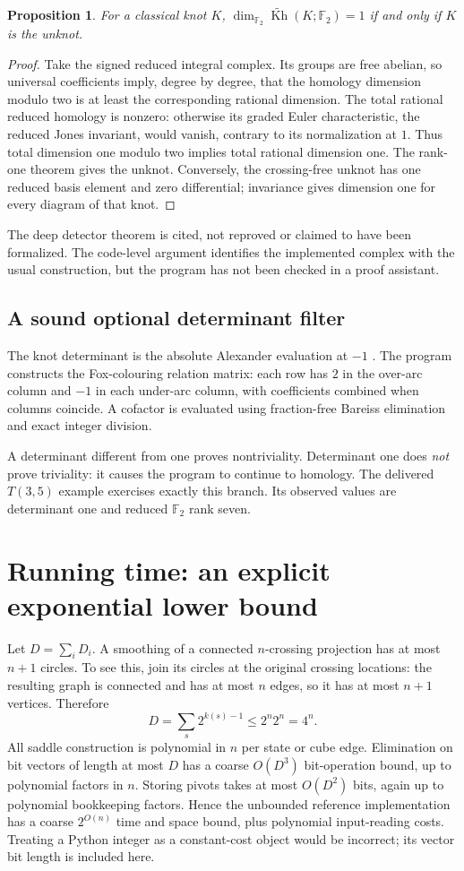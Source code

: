 \documentclass[11pt]{article}
\newtheorem{proposition}[theorem]{Proposition}
\theoremstyle{remark}\newtheorem{remark}[theorem]{Remark}
\newcommand{\F}{\mathbb F_2}
\newcommand{\Kh}{\widetilde{\operatorname{Kh}}}
\begin{document}
\begin{proposition}
For a classical knot $K$, $\dim_{\F}\Kh(K;\F)=1$ if and only if $K$ is the
unknot.
\end{proposition}
\begin{proof}
Take the signed reduced integral complex. Its groups are free abelian, so
universal coefficients imply, degree by degree, that the homology dimension
modulo two is at least the corresponding rational dimension. The total
rational reduced homology is nonzero: otherwise its graded Euler
characteristic, the reduced Jones invariant, would vanish, contrary to its
normalization at $1$. Thus total dimension one modulo two implies total
rational dimension one. The rank-one theorem gives the unknot. Conversely,
the crossing-free unknot has one reduced basis element and zero differential;
invariance gives dimension one for every diagram of that knot.
\end{proof}

The deep detector theorem is cited, not reproved or claimed to have been
formalized. The code-level argument identifies the implemented complex with
the usual construction, but the program has not been checked in a proof
assistant.

\subsection{A sound optional determinant filter}
The knot determinant is the absolute Alexander evaluation at $-1$
\cite{determinant}. The program constructs the Fox-colouring relation matrix:
each row has $2$ in the over-arc column and $-1$ in each under-arc column, with
coefficients combined when columns coincide. A cofactor is evaluated using
fraction-free Bareiss elimination and exact integer division.

A determinant different from one proves nontriviality. Determinant one does
\emph{not} prove triviality: it causes the program to continue to homology.
The delivered $T(3,5)$ example exercises exactly this branch. Its observed
values are determinant one and reduced $\F$ rank seven.

\section{Running time: an explicit exponential lower bound}

Let $D=\sum_iD_i$. A smoothing of a connected $n$-crossing projection has at
most $n+1$ circles. To see this, join its circles at the original crossing
locations: the resulting graph is connected and has at most $n$ edges, so it
has at most $n+1$ vertices. Therefore
\[
 D=\sum_s2^{k(s)-1}\leq 2^n2^n=4^n.
\]
All saddle construction is polynomial in $n$ per state or cube edge. Elimination
on bit vectors of length at most $D$ has a coarse $O(D^3)$ bit-operation bound,
up to polynomial factors in $n$. Storing pivots takes at most $O(D^2)$ bits,
again up to polynomial bookkeeping factors. Hence the unbounded reference
implementation has a coarse $2^{O(n)}$ time and space bound, plus polynomial
input-reading costs. Treating a Python integer as a constant-cost object would
be incorrect; its vector bit length is included here.
\end{document}
